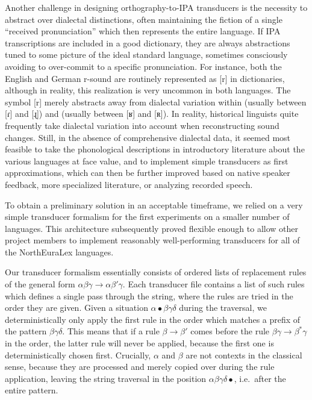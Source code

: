 Another challenge in designing orthography-to-IPA transducers is the necessity to abstract over dialectal distinctions, often maintaining the fiction of a single ``received pronunciation'' which then represents the entire language. If IPA transcriptions are included in a good dictionary, they are always abstractions tuned to some picture of the ideal standard language, sometimes consciously avoiding to over-commit to a specific pronunciation. For instance, both the English and German r-sound are routinely represented as [r] in dictionaries, although in reality, this realization is very uncommon in both languages. The symbol [r] merely abstracts away from dialectal variation within  (usually between [ɾ] and [ɻ]) and  (usually between [ʁ] and [ʀ]). In reality, historical linguists quite frequently take dialectal variation into account when reconstructing sound changes. Still, in the absence of comprehensive dialectal data, it seemed most feasible to take the phonological descriptions in introductory literature about the various languages at face value, and to implement simple transducers as first approximations, which can then be further improved based on native speaker feedback, more specialized literature, or analyzing recorded speech.

To obtain a preliminary solution in an acceptable timeframe, we relied on a very simple transducer formalism for the first experiments on a smaller number of languages. This architecture subsequently proved flexible enough to allow other project members to implement reasonably well-performing transducers for all of the NorthEuraLex languages.

Our transducer formalism essentially consists of ordered lists of replacement rules of the general form $\alpha\beta\gamma \rightarrow \alpha\beta'\gamma$. Each transducer file contains a list of such rules which defines a single pass through the string, where the rules are tried in the order they are given. Given a situation $\alpha \bullet \beta\gamma\delta$ during the traversal, we deterministically only apply the first rule in the order which matches a prefix of the pattern $\beta\gamma\delta$. This means that if a rule $\beta \rightarrow \beta'$ comes before the rule $\beta\gamma \rightarrow \beta^*\gamma$ in the order, the latter rule will never be applied, because the first one is deterministically chosen first. Crucially, $\alpha$ and $\beta$ are not contexts in the classical sense, because they are processed and merely copied over during the rule application, leaving the string traversal in the position $\alpha\beta\gamma\delta \bullet $, i.e.\ after the entire pattern.

